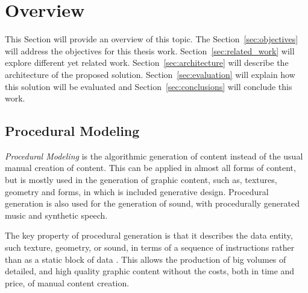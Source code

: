 
% 
% 

\section{Overview} %
\label{sec:overview}


This Section will provide an overview of this topic. The Section~\ref{sec:objectives} will address the objectives for this thesis work. Section~\ref{sec:related_work} will explore different yet related work. Section~\ref{sec:architecture} will describe the architecture of the proposed solution. Section~\ref{sec:evaluation} will explain how this solution will be evaluated and Section~\ref{sec:conclusions} will conclude this work.

\subsection{Procedural Modeling} %
\label{sub:procedural_modeling}

\emph{Procedural Modeling} is the algorithmic generation of content instead of the usual manual creation of content. This can be applied in almost all forms of content, but is mostly used in the generation of graphic content, such as, textures, geometry and forms, in which is included generative design. Procedural generation is also used for the generation of sound, with procedurally generated music and synthetic speech.

The key property of procedural generation is that it describes the data entity, such texture, geometry, or sound, in terms of a sequence of instructions rather than as a static block of data \cite{Kelly}. This allows the production of big volumes of detailed, and high quality graphic content without the costs, both in time and price, of manual content creation.




